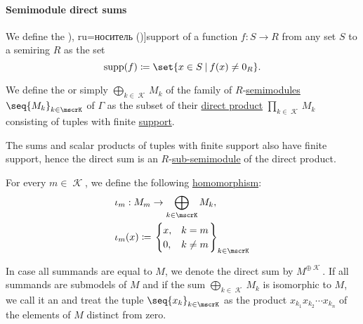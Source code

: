 \paragraph{Semimodule direct sums}

\begin{definition}\label{def:function_support}
  We define the \term[bg=носител (\cite[58]{Боянов2008}), ru=носитель (\cite[135]{КанторовичАкилов1984})]{support} of a function \( f: S \to R \) from any set \( S \) to a semiring \( R \) as the set
  \begin{equation*}
    \supp(f) \coloneqq \set{ x \in S \given f(x) \neq 0_R }.
  \end{equation*}
\end{definition}

\begin{definition}\label{def:semimodule_direct_sum}\mimprovised
  We define the  or simply  \( \bigoplus_{k \in \mscrK} M_k \) of the family of \( R \)-\hyperref[def:semimodule]{semimodules} \( \seq{ M_k }_{k \in \mscrK} \) of \( \Gamma \) as the subset of their \hyperref[def:first_order_direct_product]{direct product} \( \prod_{k \in \mscrK} M_k \) consisting of tuples with finite \hyperref[def:function_support]{support}.

  The sums and scalar products of tuples with finite support also have finite support, hence the direct sum is an \( R \)-\hyperref[def:semimodule/submodel]{sub-semimodule} of the direct product.

  \begin{thmenum}
     For every \( m \in \mscrK \), we define the following  \hyperref[def:semimodule/homomorphism]{homomorphism}:
    \begin{equation*}
      \begin{aligned}
        &\iota_m: M_m \to \bigoplus_{k \in \mscrK} M_k, \\
        &\iota_m(x) \coloneqq \begin{rcases}
          \begin{cases}
            x, &k = m \\
            0, &k \neq m
          \end{cases}
        \end{rcases}_{k \in \mscrK}
      \end{aligned}
    \end{equation*}

     In case all summands are equal to \( M \), we denote the direct sum by \( M^{\oplus \mscrK} \).
     If all summands are submodels of \( M \) and if the sum \( \bigoplus_{k \in \mscrK} M_k \) is isomorphic to \( M \), we call it an  and treat the tuple \( \seq{ x_k }_{k \in \mscrK} \) as the product \( x_{k_1} x_{k_2} \cdots x_{k_n} \) of the elements of \( M \) distinct from zero.
  \end{thmenum}
\end{definition}

